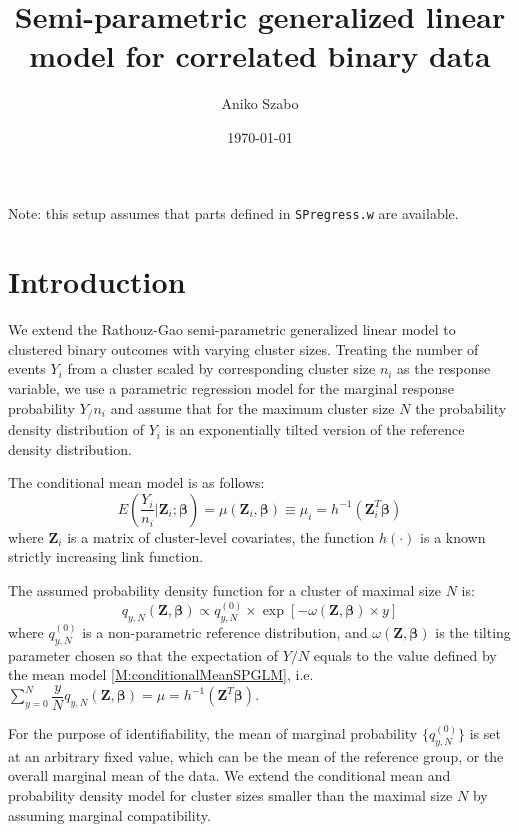 \documentclass[reqno]{amsart}
\title{Semi-parametric generalized linear model for correlated binary data}
\author{Aniko Szabo}
\date{\today}
\begin{document}
\maketitle

Note: this setup assumes that parts defined in \texttt{SPregress.w} are available.

\section{Introduction}

We extend the Rathouz-Gao semi-parametric generalized linear model to clustered binary outcomes with varying cluster sizes. Treating the number of events $Y_i$ from a cluster scaled by corresponding cluster size $n_i$ as the response variable, we use a parametric regression model for the marginal response probability $Y_/n_i$ and assume that for the maximum cluster size $N$ the probability density distribution of $Y_i$ is an exponentially tilted version of the reference density distribution.

The conditional mean model is as follows:
\begin{equation}\label{M:conditionalMeanSPGLM}
     E(\dfrac{Y_i}{n_i} | \boldsymbol{Z}_i; \boldsymbol{\beta})=\mu(\boldsymbol{Z}_i,\boldsymbol{\beta}) \equiv \mu_i = h^{-1}( \boldsymbol{Z}_i^{T} \boldsymbol{\beta})
\end{equation}
where $\boldsymbol{Z}_i$ is a matrix of cluster-level covariates, the function $h(\cdot)$ is a known strictly increasing link function.

The assumed probability density function for a cluster of maximal size $N$ is:
\begin{equation}\label{M:densitySPGLM}
    q_{y,N} (\boldsymbol{Z}, \boldsymbol{\beta}) \propto q_{y,N}^{(0)} \times \exp [ - \omega(\boldsymbol{Z}, \boldsymbol{\beta}) \times y]
\end{equation}
where $q_{y,N}^{(0)}$ is a non-parametric reference distribution, and $\omega(\boldsymbol{Z}, \boldsymbol{\beta})$ is the tilting parameter chosen so that the expectation of $Y/N$ equals to the value defined by the mean model \eqref{M:conditionalMeanSPGLM}, i.e.\  $\sum_{y=0}^{N} \dfrac{y}{N} q_{y,N}(\boldsymbol{Z}, \boldsymbol{\beta}) = \mu = h^{-1}( \boldsymbol{Z}^{T} \boldsymbol{\beta}) $. 

For the purpose of identifiability, the mean of marginal probability $\{ q_{y,N}^{(0)} \}$ is set at an arbitrary fixed value, which can be the mean of the reference group, or the overall marginal mean of the data. We extend the conditional mean and probability density model for  cluster sizes smaller than the maximal size $N$ by assuming marginal compatibility.
\end{document}
